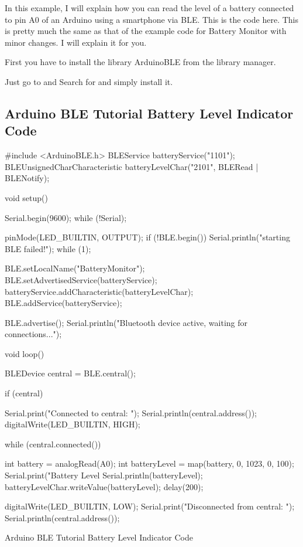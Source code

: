 In this example, I will explain how you can read the level of a battery connected to pin A0 of an Arduino using a smartphone via BLE. This is the code here. This is pretty much the same as that of the example code for Battery Monitor with minor changes. I will explain it for you.

First you have to install the library ArduinoBLE from the library manager.

Just go to  and Search for  and simply install it.

\subsection{Arduino BLE Tutorial Battery Level Indicator Code}

\begin{code}
\begin{Arduino}
#include <ArduinoBLE.h>
BLEService batteryService("1101");
BLEUnsignedCharCharacteristic batteryLevelChar("2101", BLERead | BLENotify);

void setup() {
    Serial.begin(9600);
    while (!Serial);
    
    pinMode(LED_BUILTIN, OUTPUT);
    if (!BLE.begin()) 
    {
        Serial.println("starting BLE failed!");
        while (1);
    }
    
    BLE.setLocalName("BatteryMonitor");
    BLE.setAdvertisedService(batteryService);
    batteryService.addCharacteristic(batteryLevelChar);
    BLE.addService(batteryService);
    
    BLE.advertise();
    Serial.println("Bluetooth device active, waiting for connections...");
}

void loop() 
{
    BLEDevice central = BLE.central();
    
    if (central) 
    {
        Serial.print("Connected to central: ");
        Serial.println(central.address());
        digitalWrite(LED_BUILTIN, HIGH);
        
        while (central.connected()) {
            
            int battery = analogRead(A0);
            int batteryLevel = map(battery, 0, 1023, 0, 100);
            Serial.print("Battery Level %
            Serial.println(batteryLevel);
            batteryLevelChar.writeValue(batteryLevel);
            delay(200);
            
        }
    }
    digitalWrite(LED_BUILTIN, LOW);
    Serial.print("Disconnected from central: ");
    Serial.println(central.address());
}
\end{Arduino}
\caption{Arduino BLE Tutorial Battery Level Indicator Code}

\end{code}


